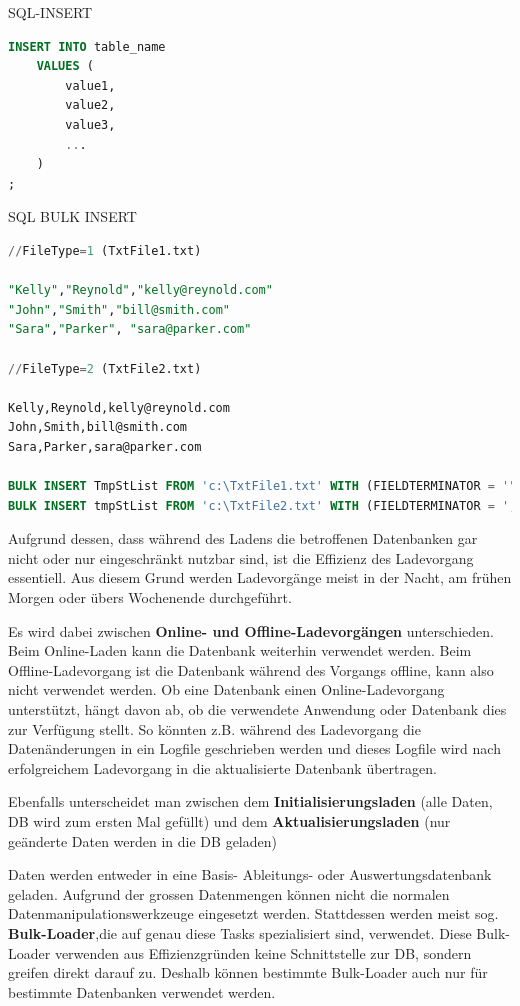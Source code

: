 \documentclass[a4paper, 11pt, nofootinbib]{article}
\begin{document}
\noindent SQL-INSERT

\begin{lstlisting}[language=SQL]
INSERT INTO table_name
	VALUES (
		value1,
		value2,
		value3,
		...
	)
; 
\end{lstlisting}

\noindent SQL BULK INSERT

\begin{lstlisting}[language=SQL]
//FileType=1 (TxtFile1.txt)

"Kelly","Reynold","kelly@reynold.com" 
"John","Smith","bill@smith.com" 
"Sara","Parker", "sara@parker.com"

//FileType=2 (TxtFile2.txt) 

Kelly,Reynold,kelly@reynold.com 
John,Smith,bill@smith.com 
Sara,Parker,sara@parker.com 

BULK INSERT TmpStList FROM 'c:\TxtFile1.txt' WITH (FIELDTERMINATOR = '","') 
BULK INSERT tmpStList FROM 'c:\TxtFile2.txt' WITH (FIELDTERMINATOR = ',')
\end{lstlisting}


\vspace{10px}

\noindent Aufgrund dessen, dass während des Ladens die betroffenen Datenbanken gar nicht oder nur eingeschränkt nutzbar sind, ist die Effizienz des Ladevorgang essentiell. Aus diesem Grund werden Ladevorgänge meist in der Nacht, am frühen Morgen oder übers Wochenende durchgeführt.

Es wird dabei zwischen \textbf{Online- und Offline-Ladevorgängen} unterschieden. Beim Online-Laden kann die Datenbank weiterhin verwendet werden. Beim Offline-Ladevorgang ist die Datenbank während des Vorgangs offline, kann also nicht verwendet werden. Ob eine Datenbank einen Online-Ladevorgang unterstützt, hängt davon ab, ob die verwendete Anwendung oder Datenbank dies zur Verfügung stellt. So könnten z.B. während des Ladevorgang die Datenänderungen in ein Logfile geschrieben werden und dieses Logfile wird nach erfolgreichem Ladevorgang in die aktualisierte Datenbank übertragen.

Ebenfalls unterscheidet man zwischen dem \textbf{Initialisierungsladen} (alle Daten, DB wird zum ersten Mal gefüllt) und dem \textbf{Aktualisierungsladen} (nur geänderte Daten werden in die DB geladen)

Daten werden entweder in eine Basis- Ableitungs- oder Auswertungsdatenbank geladen. Aufgrund der grossen Datenmengen können nicht die normalen Datenmanipulationswerkzeuge eingesetzt werden. Stattdessen werden meist sog. \textbf{Bulk-Loader},die auf genau diese Tasks spezialisiert sind, verwendet. Diese Bulk-Loader verwenden aus Effizienzgründen keine Schnittstelle zur DB, sondern greifen direkt darauf zu. Deshalb können bestimmte Bulk-Loader auch nur für bestimmte Datenbanken verwendet werden. 
\end{document}
